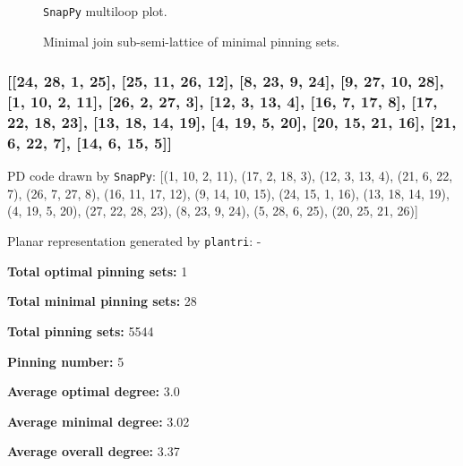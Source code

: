 \documentclass{article}%
\begin{document}
\begin{multicols}{2}
\begin{figure}[H]
\centering

\caption{\texttt{SnapPy} multiloop plot.}
\label{fig:tex/img/[[10, 14, 1, 11], [11, 15, 12, 24], [9, 17, 10, 18], [13, 16, 14, 17], [1, 16, 2, 15], [12, 2, 13, 3], [3, 23, 4, 24], [18, 4, 19, 5], [22, 8, 23, 9], [19, 25, 20, 28], [5, 28, 6, 27], [21, 26, 22, 27.svg}
\end{figure}
\columnbreak

\begin{figure}[H]
\centering
\scalebox{0.8}{}
\caption{Minimal join sub-semi-lattice of minimal pinning sets.}
\label{fig:tex/img/[[10, 14, 1, 11], [11, 15, 12, 24], [9, 17, 10, 18], [13, 16, 14, 17], [1, 16, 2, 15], [12, 2, 13, 3], [3, 23, 4, 24], [18, 4, 19, 5], [22, 8, 23, 9], [19, 25, 20, 28], [5, 28, 6, 27], [21, 26, 22, 27.pgf}
\end{figure}
\end{multicols}

\newpage

\subsubsection{[[24, 28, 1, 25], [25, 11, 26, 12], [8, 23, 9, 24], [9, 27, 10, 28], [1, 10, 2, 11], [26, 2, 27, 3], [12, 3, 13, 4], [16, 7, 17, 8], [17, 22, 18, 23], [13, 18, 14, 19], [4, 19, 5, 20], [20, 15, 21, 16], [21, 6, 22, 7], [14, 6, 15, 5]]}

{\small\noindent PD code drawn by \texttt{SnapPy}: [(1, 10, 2, 11), (17, 2, 18, 3), (12, 3, 13, 4), (21, 6, 22, 7), (26, 7, 27, 8), (16, 11, 17, 12), (9, 14, 10, 15), (24, 15, 1, 16), (13, 18, 14, 19), (4, 19, 5, 20), (27, 22, 28, 23), (8, 23, 9, 24), (5, 28, 6, 25), (20, 25, 21, 26)]}

{\small\noindent Planar representation generated by \texttt{plantri}: -}

\begin{multicols}{2}
{\normalsize \noindent\textbf{Total optimal pinning sets:} 1

\noindent\textbf{Total minimal pinning sets:} 28

\noindent\textbf{Total pinning sets:} 5544

\noindent\textbf{Pinning number:} 5

}
\columnbreak

{\normalsize \noindent\textbf{Average optimal degree:} 3.0

\noindent\textbf{Average minimal degree:} 3.02

\noindent\textbf{Average overall degree:} 3.37

}
\end{multicols}
\end{document}

